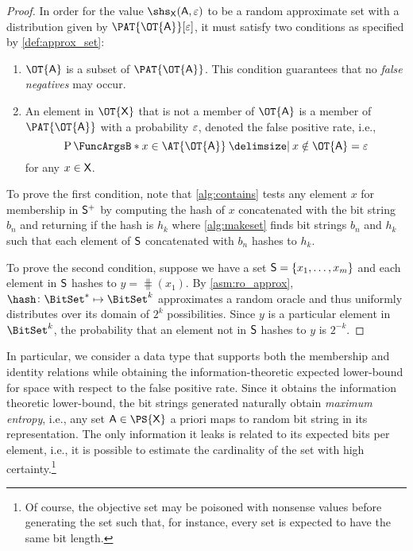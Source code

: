 \documentclass[ ../main.tex]{subfiles}
\begin{document}
\begin{proof}
In order for the value $\shs_{\Set{X}}(\Set{A},\fprate)$ to be a random approximate set with a distribution given by $\PAT{\OT{\Set{A}}}[\fprate]$, it must satisfy two conditions as specified by \cref{def:approx_set}:
\begin{enumerate}
	\item $\OT{\Set{A}}$ is a subset of $\PAT{\OT{\Set{A}}}$.
	This condition guarantees that no \emph{false negatives} may occur.
	\item An element in $\OT{\Set{X}}$ that is not a member of $\OT{\Set{A}}$ is a member 
	of $\PAT{\OT{\Set{A}}}$ with a probability $\varepsilon$, denoted the false positive rate, 
	i.e.,
	\begin{equation}
	\Prob{x \in \AT{\OT{\Set{A}}} \Given x \notin \OT{\Set{A}}} = \fprate
	\end{equation}
	for any $x \in \Set{X}$.
\end{enumerate}

To prove the first condition, note that \cref{alg:contains} tests any element $x$ for membership in $\PASet{S}$ by computing the hash of $x$ concatenated with the bit string $b_n$ and returning \True if the hash is $h_k$ where \cref{alg:makeset} finds bit strings $b_n$ and $h_k$ such that each element of $\Set{S}$ concatenated with $b_n$ hashes to $h_k$.

To prove the second condition, suppose we have a set $\Set{S} = \{x_1,\ldots,x_m\}$ and each element in $\Set{S}$ hashes to $y = \hash(x_1)$. By \cref{asm:ro_approx}, $\hash \colon \BitSet^* \mapsto \BitSet^k$ approximates a random oracle and thus uniformly distributes over its domain of $2^k$ possibilities. Since $y$ is a particular element in $\BitSet^k$, the probability that an element not in $\Set{S}$ hashes to $y$ is $2^{-k}$.
\end{proof}




In particular, we consider a data type that supports both the membership and identity relations while obtaining the information-theoretic expected lower-bound for space with respect to the false positive rate.
Since it obtains the information theoretic lower-bound, the bit strings generated naturally obtain \emph{maximum entropy}, i.e., any set $\Set{A} \in \PS{\Set{X}}$ a priori maps to random bit string in its representation.
The only information it leaks is related to its expected bits per element, i.e., it is possible to estimate the cardinality of the set with high certainty.\footnote{Of course, the objective set may be poisoned with nonsense values before generating the set such that, for instance, every set is expected to have the same bit length.}
\end{document}
